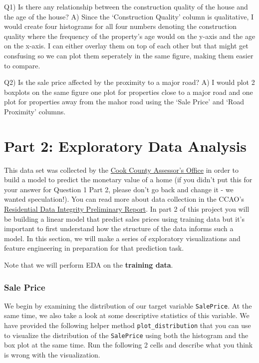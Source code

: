 \documentclass[11pt]{article}
\begin{document}
    Q1) Is there any relationship between the construction quality of the
house and the age of the house? A) Since the `Construction Quality'
column is qualitative, I would create four histograms for all four
numbers denoting the construction quality where the frequency of the
property's age would on the y-axis and the age on the x-axis. I can
either overlay them on top of each other but that might get consfusing
so we can plot them seperately in the same figure, making them easier to
compare.

Q2) Is the sale price affected by the proximity to a major road? A) I
would plot 2 boxplots on the same figure one plot for properties close
to a major road and one plot for properties away from the mahor road
using the `Sale Price' and `Road Proximity' columns.

    \hypertarget{part-2-exploratory-data-analysis}{%
\section{Part 2: Exploratory Data
Analysis}\label{part-2-exploratory-data-analysis}}

This data set was collected by the
\href{https://datacatalog.cookcountyil.gov/Property-Taxation/Archive-Cook-County-Assessor-s-Residential-Sales-D/5pge-nu6u}{Cook
County Assessor's Office} in order to build a model to predict the
monetary value of a home (if you didn't put this for your answer for
Question 1 Part 2, please don't go back and change it - we wanted
speculation!). You can read more about data collection in the CCAO's
\href{https://gitlab.com/ccao-data-science---modeling/ccao_sf_cama_dev/-/blob/master/documentation/Preliminary\%20Report\%20on\%20Data\%20Integrity\%20June\%207,\%202019.pdf}{Residential
Data Integrity Preliminary Report}. In part 2 of this project you will
be building a linear model that predict sales prices using training data
but it's important to first understand how the structure of the data
informs such a model. In this section, we will make a series of
exploratory visualizations and feature engineering in preparation for
that prediction task.

Note that we will perform EDA on the \textbf{training data}.

\hypertarget{sale-price}{%
\subsubsection{Sale Price}\label{sale-price}}

We begin by examining the distribution of our target variable
\texttt{SalePrice}. At the same time, we also take a look at some
descriptive statistics of this variable. We have provided the following
helper method \texttt{plot\_distribution} that you can use to visualize
the distribution of the \texttt{SalePrice} using both the histogram and
the box plot at the same time. Run the following 2 cells and describe
what you think is wrong with the visualization.
\end{document}
